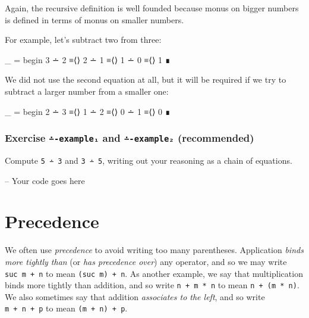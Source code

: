 Again, the recursive definition is well founded because monus on bigger
numbers is defined in terms of monus on smaller numbers.

For example, let's subtract two from three:

\begin{fence}
\begin{code}
_ =
  begin
    3 ∸ 2
  ≡⟨⟩
    2 ∸ 1
  ≡⟨⟩
    1 ∸ 0
  ≡⟨⟩
    1
  ∎
\end{code}
\end{fence}

We did not use the second equation at all, but it will be required if we
try to subtract a larger number from a smaller one:

\begin{fence}
\begin{code}
_ =
  begin
    2 ∸ 3
  ≡⟨⟩
    1 ∸ 2
  ≡⟨⟩
    0 ∸ 1
  ≡⟨⟩
    0
  ∎
\end{code}
\end{fence}

\hypertarget{Naturals-monus-examples}{%
\subsubsection{\texorpdfstring{Exercise \texttt{∸-example₁} and
\texttt{∸-example₂}
(recommended)}{Exercise ∸-example₁ and ∸-example₂ (recommended)}}\label{Naturals-monus-examples}}

Compute \texttt{5\ ∸\ 3} and \texttt{3\ ∸\ 5}, writing out your
reasoning as a chain of equations.

\begin{fence}
\begin{code}
-- Your code goes here
\end{code}
\end{fence}

\hypertarget{precedence}{%
\section{Precedence}\label{precedence}}

We often use \emph{precedence} to avoid writing too many parentheses.
Application \emph{binds more tightly than} (or \emph{has precedence
over}) any operator, and so we may write \texttt{suc\ m\ +\ n} to mean
\texttt{(suc\ m)\ +\ n}. As another example, we say that multiplication
binds more tightly than addition, and so write \texttt{n\ +\ m\ *\ n} to
mean \texttt{n\ +\ (m\ *\ n)}. We also sometimes say that addition
\emph{associates to the left}, and so write \texttt{m\ +\ n\ +\ p} to
mean \texttt{(m\ +\ n)\ +\ p}.

